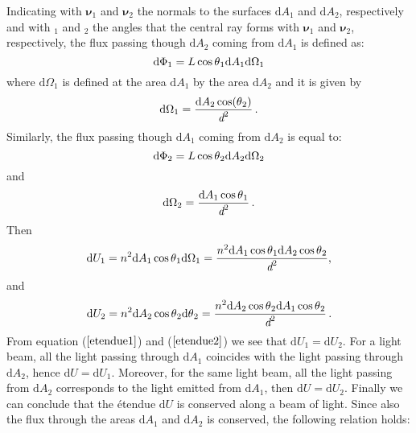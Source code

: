 Indicating with $\boldsymbol{\nu}_1$ and $\boldsymbol{\nu}_2$ the normals to the surfaces $\textrm{d}A_1$ and $\textrm{d}A_2$, respectively and with \myangle$_1$ and \myangle$_2$ the angles that the central ray forms with $\boldsymbol{\nu}_1$ and $\boldsymbol{\nu}_2$, respectively,
the flux passing though $\textrm{d}A_2$ coming from $\textrm{d}A_1$ is defined as:
\begin{equation}
\textrm{d}\Phi_1 = L \cos\mbox{$\theta$}_1 \textrm{d}A_1 \textrm{d}\Omega_1
\end{equation}
where $\textrm{d}\Omega_1$ is defined at the area $\textrm{d}A_1$ by the area $\textrm{d}A_2$ and it is given by 
\begin{equation}
\textrm{d}\Omega_1 = \frac{\textrm{d}A_2\cos(\mbox{$\theta$}_2)}{\textit{d}^2}\,.
\end{equation}
Similarly, the flux passing though $\textrm{d}A_1$ coming from $\textrm{d}A_2$ is equal to:
\begin{equation}
\textrm{d}\Phi_2 = L \cos\mbox{$\theta$}_2 \textrm{d}A_2 \textrm{d}\Omega_2
\end{equation}
and
\begin{equation}
\textrm{d}\Omega_2 = \frac{\textrm{d}A_1\cos\mbox{$\theta$}_1}{\textit{d}^2}\,.
\end{equation}
Then \begin{equation}
\label{etendue1}
\textrm{d}U_1 = n^2 \textrm{d}A_1\cos\mbox{$\theta$}_1\textrm{d}\Omega_1= \frac{n^2 \textrm{d}A_1\cos\mbox{$\theta$}_1\textrm{d}A_2\cos\mbox{$\theta$}_2}{\textit{d}^2},
\end{equation}
and
\begin{equation}
\label{etendue2}
\textrm{d}U_2 = n^2 \textrm{d}A_2\cos\mbox{$\theta$}_2\textrm{d}\mbox{$\theta$}_2= \frac{ n^2 \textrm{d}A_2\cos\mbox{$\theta$}_2\textrm{d}A_1\cos\mbox{$\theta$}_2}{\textit{d}^2}\,.
\end{equation}
From equation ($\ref{etendue1}$) and ($\ref{etendue2}$) we see that $\textrm{d}U_1=\textrm{d}U_2$.
For a light beam, all the light passing through $\textrm{d}A_1$ coincides with the light passing through $\textrm{d}A_2$, hence $\textrm{d}U = \textrm{d}U_1$. Moreover, for the same light beam, all the light passing from $\textrm{d}A_2$ corresponds to the light emitted from $\textrm{d}A_1$, then $\textrm{d}U=\textrm{d}U_2$. Finally we can conclude that the \'{e}tendue $\textrm{d}U$ is conserved along a beam of light. Since also the flux through the areas $\textrm{d}A_1$ and $\textrm{d}A_2$ is conserved, the following relation holds:
